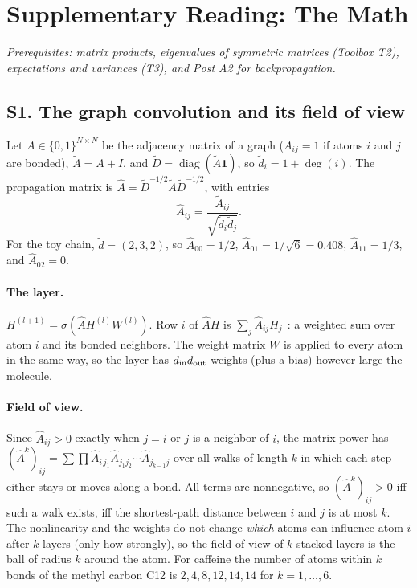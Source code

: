 \documentclass[11pt]{article}
\newcommand{\Ah}{\hat{A}}
\newcommand{\At}{\tilde{A}}
\newcommand{\Dt}{\tilde{D}}
\begin{document}
\clearpage
\section*{Supplementary Reading: The Math}
\textit{Prerequisites: matrix products, eigenvalues of symmetric matrices (Toolbox T2), expectations and variances (T3), and Post A2 for backpropagation.}

\label{sec:S1}
\subsection*{S1. The graph convolution and its field of view}
Let $A\in\{0,1\}^{N\times N}$ be the adjacency matrix of a graph ($A_{ij}=1$ if atoms $i$ and $j$ are bonded), $\At=A+I$, and $\Dt=\operatorname{diag}(\At\mathbf 1)$, so $\tilde d_i=1+\deg(i)$. The propagation matrix is $\Ah=\Dt^{-1/2}\At\Dt^{-1/2}$, with entries
\[
  \Ah_{ij}=\frac{\At_{ij}}{\sqrt{\tilde d_i\tilde d_j}} .
\]
For the toy chain, $\tilde d=(2,3,2)$, so $\Ah_{00}=1/2$, $\Ah_{01}=1/\sqrt6=0.408$, $\Ah_{11}=1/3$, and $\Ah_{02}=0$.

\paragraph{The layer.} $H^{(l+1)}=\sigma(\Ah H^{(l)}W^{(l)})$. Row $i$ of $\Ah H$ is $\sum_j\Ah_{ij}H_{j\cdot}$: a weighted sum over atom $i$ and its bonded neighbors. The weight matrix $W$ is applied to every atom in the same way, so the layer has $d_{\rm in}d_{\rm out}$ weights (plus a bias) however large the molecule.

\paragraph{Field of view.} Since $\Ah_{ij}>0$ exactly when $j=i$ or $j$ is a neighbor of $i$, the matrix power has $(\Ah^k)_{ij}=\sum\prod\Ah_{i\,j_1}\Ah_{j_1j_2}\cdots\Ah_{j_{k-1}j}$ over all walks of length $k$ in which each step either stays or moves along a bond. All terms are nonnegative, so $(\Ah^k)_{ij}>0$ iff such a walk exists, iff the shortest-path distance between $i$ and $j$ is at most $k$. The nonlinearity and the weights do not change \emph{which} atoms can influence atom $i$ after $k$ layers (only how strongly), so the field of view of $k$ stacked layers is the ball of radius $k$ around the atom. For caffeine the number of atoms within $k$ bonds of the methyl carbon C12 is $2,4,8,12,14,14$ for $k=1,\dots,6$.
\end{document}
